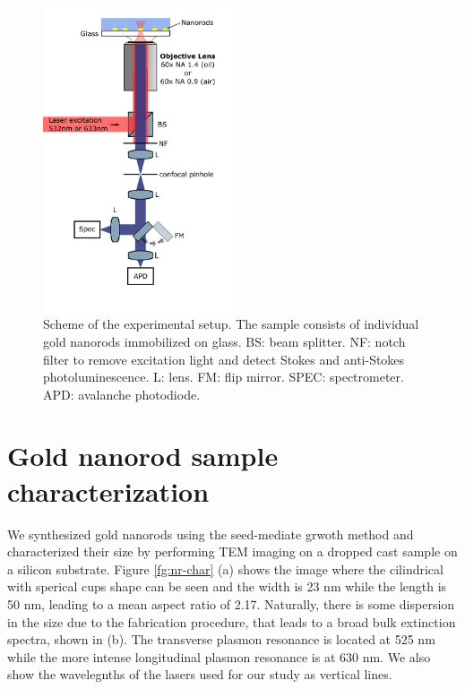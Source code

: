 \documentclass[journal=nalefd,manuscript=letter]{achemso}
\begin{document}
\begin{figure}[htp] \centering
\includegraphics[width=0.5\textwidth]{Figures/Supplementary/02_Setup/setup.png}
\caption{Scheme of the experimental setup. The sample consists of individual gold nanorods immobilized on glass. BS: beam splitter. NF: notch filter to remove excitation light and detect Stokes and anti-Stokes photoluminescence. L: lens. FM: flip mirror. SPEC: spectrometer. APD: avalanche photodiode.}
	\label{fig:setup}
\end{figure}


\section{Gold nanorod sample characterization}

We synthesized gold nanorods using the seed-mediate grwoth method \cite{nikoobakht2003preparation} 
and characterized their size by performing TEM imaging on a dropped cast sample on a silicon substrate. 
Figure \ref{fg:nr-char} (a) shows the image where the cilindrical with sperical cups shape can be seen 
and the width is 23 nm while the length is 50 nm, 
leading to a mean aspect ratio of 2.17. Naturally, there is some
dispersion in the size due to the fabrication procedure, that leads to a broad bulk extinction 
spectra, shown in (b). The transverse plasmon resonance is located at 525 nm while the more intense 
longitudinal plasmon resonance is at 630 nm. We also show the wavelegnths of the lasers used for 
our study as vertical lines. 
\end{document}
